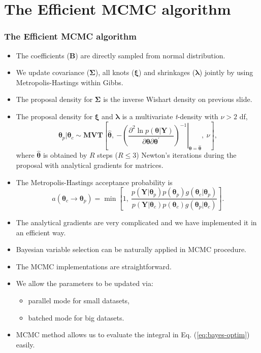 \documentclass[11pt]{beamer}
\begin{document}
\section{The Efficient MCMC algorithm}
\begin{frame}[allowframebreaks]
  \frametitle{The Efficient MCMC algorithm}
  \begin{itemize}
  \item The coefficients ($\bm{B}$) are directly sampled from normal distribution.
  \item We update covariance ($\bm{\Sigma}$), all knots ($\bm{\xi}$) and shrinkages ($\bm{\lambda}$) jointly by using
    Metropolis-Hastings within Gibbs.
  \item  The proposal density for $\bm{\Sigma}$ is the inverse Wishart
    density on previous slide.
  \item The proposal density for $\bm{\xi}$ and $\bm{\lambda}$ is a multivariate \emph{t}-density with $\nu>2$ df,
    \[
    \bm{\theta}_{p}|\bm{\theta}_{c}\sim\bm{MVT}\left[\bm{\hat{\theta}},~\left.-\left(\frac{\partial^{2}\ln
            p(\bm{\theta}|\bm{Y})}{\partial\bm{\theta}\partial\bm{\theta}^{\prime}}\right)^{-1}\right\vert
      _{\bm{\theta}=\bm{\hat{\theta}}},~\nu\right],
    \]
    where $\bm{\hat{\theta}}$ is obtained by $R$ steps ($R\leq 3$) Newton's
    iterations during the proposal with analytical gradients for matrices.

  \item The Metropolis-Hastings acceptance probability is
    \[
    a\left(\bm{\theta}_{c}\rightarrow\bm{\theta}_{p}\right)=\min\left[1,~\frac{p(\bm{Y}|\bm{\theta}_{p})p(\bm{\theta}_{p})g(\bm{\theta}_{c}|\bm{\theta}_{p})}{p(\bm{Y}|\bm{\theta}_{c})p(\bm{\theta}_{c})g(\bm{\theta}_{p}|\bm{\theta}_{c})}\right].
    \]

  \item The analytical gradients are very complicated and we have
    implemented it in an efficient way.

  \item Bayesian variable selection can be naturally applied in MCMC procedure.

  \item The MCMC implementations are straightforward.

  \item We allow the parameters to be updated via:
    \begin{itemize}
    \item parallel mode for small datasets,
    \item batched mode for big datasets.
    \end{itemize}


  \item MCMC method allows us to evaluate the integral in
    Eq. (\ref{eq:bayes-optim}) easily.

  \end{itemize}

\end{frame}
\end{document}

